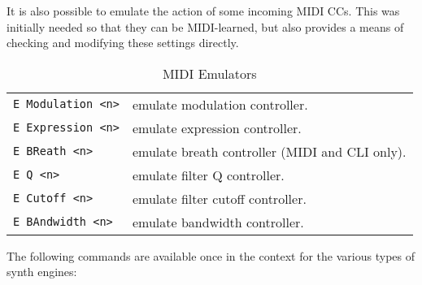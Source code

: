    It is also possible to emulate the action of some incoming MIDI CCs. This
   was initially needed so that they can be MIDI-learned, but also provides
   a means of checking and modifying these settings directly.

   \begin{table}[H]
      \centering
      \caption{MIDI Emulators}
      \label{table:yoshimi_part_midi_emulators}
      \begin{tabular}{l l}
\texttt{E Modulation <n>} &
   emulate modulation controller. \\
\texttt{E Expression <n>} &
   emulate expression controller. \\
\texttt{E BReath <n>} &
   emulate breath controller (MIDI and CLI only). \\
\texttt{E Q <n>} &
   emulate filter Q controller. \\
\texttt{E Cutoff <n>} &
   emulate filter cutoff controller. \\
\texttt{E BAndwidth <n>} &
   emulate bandwidth controller. \\
      \end{tabular}
   \end{table}

   The following commands are available once in the context for the various
   types of synth engines:

